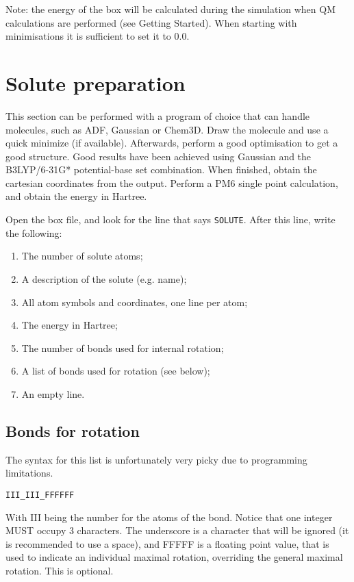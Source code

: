 Note: the energy of the box will be calculated during the simulation when QM 
calculations are performed (see Getting Started). When starting with 
minimisations it is sufficient to set it to $0.0$.

\section{Solute preparation}
This section can be performed with a program of choice that can handle 
molecules, such as ADF, Gaussian or Chem3D. Draw the molecule and use a quick 
minimize (if available). Afterwards, perform a good optimisation to get a good 
structure. Good results have been achieved using Gaussian and the B3LYP/6-31G* 
potential-base set combination.
When finished, obtain the cartesian coordinates from the output. Perform a PM6 
single point calculation, and obtain the energy in Hartree.

 Open the box file, and look for the line that says \verb|SOLUTE|. After this 
 line, write the following:

\begin{enumerate}
	\item The number of solute atoms;
	\item A description of the solute (e.g. name);
	\item All atom symbols and coordinates, one line per atom;
	\item The energy in Hartree;
	\item The number of bonds used for internal rotation;
	\item A list of bonds used for rotation (see below);
	\item An empty line.
\end{enumerate}

\subsection{Bonds for rotation}
The syntax for this list is unfortunately very picky due to programming 
limitations. 

\verb|III_III_FFFFFF|

With III being the number for the atoms of the bond. Notice that one integer 
MUST occupy 3 characters. The underscore is a character that will be ignored 
(it is recommended to use a space), 
and FFFFF is a floating point value, that is used to indicate an individual 
maximal rotation, overriding the general maximal rotation. This is optional.


